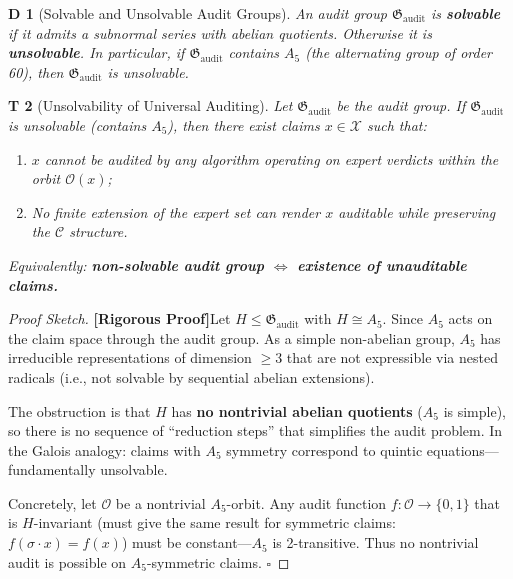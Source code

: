 \documentclass[12pt,a4paper]{article}
\newtheorem{theorem}Theorem[section]
\newtheorem{definition}[theorem]Definition
\theoremstyle{remark}
\newcommand{\AuditGrp}{\mathfrak{G}_{\mathrm{audit}}}
\newcommand{\CEC}{\mathcal{C}}
\newcommand{\ClaimSpace}{\mathcal{X}}
\newcommand{\rigorous}{\textnormal{\textbf{[Rigorous Proof]}}}
\begin{document}
\begin{definition}[Solvable and Unsolvable Audit Groups]
An audit group \(\AuditGrp\) is \textbf{solvable} if it admits a subnormal series with abelian quotients. Otherwise it is \textbf{unsolvable}. In particular, if \(\AuditGrp\) contains \(A_5\) (the alternating group of order 60), then \(\AuditGrp\) is unsolvable.
\end{definition}

\begin{theorem}[Unsolvability of Universal Auditing]\label{thm:unsolvability}
Let \(\AuditGrp\) be the audit group. If \(\AuditGrp\) is unsolvable (contains \(A_5\)), then there exist claims \(x \in \ClaimSpace\) such that:
\begin{enumerate}[label=(\roman*),itemsep=3pt]
    \item \(x\) cannot be audited by any algorithm operating on expert verdicts within the orbit \(\mathcal{O}(x)\);
    \item No finite extension of the expert set can render \(x\) auditable while preserving the \(\CEC\) structure.
\end{enumerate}
Equivalently: \textbf{non-solvable audit group \(\Longleftrightarrow\) existence of unauditable claims.}
\end{theorem}
\begin{proof}[Proof Sketch]
\rigorous Let \(H \leq \AuditGrp\) with \(H \cong A_5\). Since \(A_5\) acts on the claim space through the audit group. As a simple non-abelian group, \(A_5\) has irreducible representations of dimension \(\geq 3\) that are not expressible via nested radicals (i.e., not solvable by sequential abelian extensions).

The obstruction is that \(H\) has \textbf{no nontrivial abelian quotients} (\(A_5\) is simple), so there is no sequence of ``reduction steps'' that simplifies the audit problem. In the Galois analogy: claims with \(A_5\) symmetry correspond to quintic equations---fundamentally unsolvable.

Concretely, let \(\mathcal{O}\) be a nontrivial \(A_5\)-orbit. Any audit function \(f: \mathcal{O} \to \{0,1\}\) that is \(H\)-invariant (must give the same result for symmetric claims: \(f(\sigma\cdot x) = f(x)\)) must be constant---\(A_5\) is 2-transitive. Thus no nontrivial audit is possible on \(A_5\)-symmetric claims. \(\square\)
\end{proof}
\end{document}
